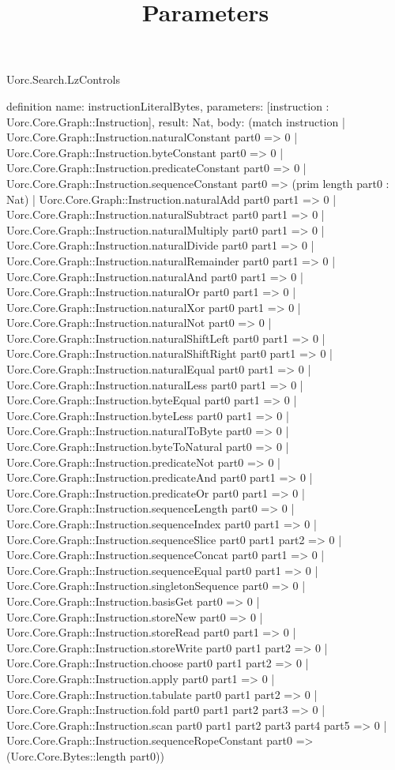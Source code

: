 \begin{lexlean}{Uorc.Search.LzControls}
\title{Parameters}
\begin{semanticmodule}
definition{
  name: instructionLiteralBytes,
  parameters: [instruction : Uorc.Core.Graph::Instruction],
  result: Nat,
  body: (match instruction
    | Uorc.Core.Graph::Instruction.naturalConstant part0 => 0
    | Uorc.Core.Graph::Instruction.byteConstant part0 => 0
    | Uorc.Core.Graph::Instruction.predicateConstant part0 => 0
    | Uorc.Core.Graph::Instruction.sequenceConstant part0 => (prim length part0 : Nat)
    | Uorc.Core.Graph::Instruction.naturalAdd part0 part1 => 0
    | Uorc.Core.Graph::Instruction.naturalSubtract part0 part1 => 0
    | Uorc.Core.Graph::Instruction.naturalMultiply part0 part1 => 0
    | Uorc.Core.Graph::Instruction.naturalDivide part0 part1 => 0
    | Uorc.Core.Graph::Instruction.naturalRemainder part0 part1 => 0
    | Uorc.Core.Graph::Instruction.naturalAnd part0 part1 => 0
    | Uorc.Core.Graph::Instruction.naturalOr part0 part1 => 0
    | Uorc.Core.Graph::Instruction.naturalXor part0 part1 => 0
    | Uorc.Core.Graph::Instruction.naturalNot part0 => 0
    | Uorc.Core.Graph::Instruction.naturalShiftLeft part0 part1 => 0
    | Uorc.Core.Graph::Instruction.naturalShiftRight part0 part1 => 0
    | Uorc.Core.Graph::Instruction.naturalEqual part0 part1 => 0
    | Uorc.Core.Graph::Instruction.naturalLess part0 part1 => 0
    | Uorc.Core.Graph::Instruction.byteEqual part0 part1 => 0
    | Uorc.Core.Graph::Instruction.byteLess part0 part1 => 0
    | Uorc.Core.Graph::Instruction.naturalToByte part0 => 0
    | Uorc.Core.Graph::Instruction.byteToNatural part0 => 0
    | Uorc.Core.Graph::Instruction.predicateNot part0 => 0
    | Uorc.Core.Graph::Instruction.predicateAnd part0 part1 => 0
    | Uorc.Core.Graph::Instruction.predicateOr part0 part1 => 0
    | Uorc.Core.Graph::Instruction.sequenceLength part0 => 0
    | Uorc.Core.Graph::Instruction.sequenceIndex part0 part1 => 0
    | Uorc.Core.Graph::Instruction.sequenceSlice part0 part1 part2 => 0
    | Uorc.Core.Graph::Instruction.sequenceConcat part0 part1 => 0
    | Uorc.Core.Graph::Instruction.sequenceEqual part0 part1 => 0
    | Uorc.Core.Graph::Instruction.singletonSequence part0 => 0
    | Uorc.Core.Graph::Instruction.basisGet part0 => 0
    | Uorc.Core.Graph::Instruction.storeNew part0 => 0
    | Uorc.Core.Graph::Instruction.storeRead part0 part1 => 0
    | Uorc.Core.Graph::Instruction.storeWrite part0 part1 part2 => 0
    | Uorc.Core.Graph::Instruction.choose part0 part1 part2 => 0
    | Uorc.Core.Graph::Instruction.apply part0 part1 => 0
    | Uorc.Core.Graph::Instruction.tabulate part0 part1 part2 => 0
    | Uorc.Core.Graph::Instruction.fold part0 part1 part2 part3 => 0
    | Uorc.Core.Graph::Instruction.scan part0 part1 part2 part3 part4 part5 => 0
    | Uorc.Core.Graph::Instruction.sequenceRopeConstant part0 => (Uorc.Core.Bytes::length part0))
}


\end{semanticmodule}
\end{lexlean}
